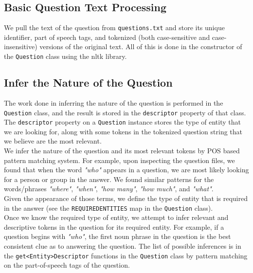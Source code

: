 \documentclass{article}
\begin{document}
\subsection{Basic Question Text Processing}
We pull the text of the question from \texttt{questions.txt} and store its unique identifier, part of speech tags, and tokenized (both case-sensitive and case-insensitive) versions of the original text. All of this is done in the constructor of the \texttt{Question} class using the nltk library.

\subsection{Infer the Nature of the Question}
The work done in inferring the nature of the question is performed in the \texttt{Question} class, and the result is stored in the \texttt{descriptor} property of that class. The \texttt{descriptor} property on a \texttt{Question} instance stores the type of entity that we are looking for, along with some tokens in the tokenized question string that we believe are the most relevant.\\

We infer the nature of the question and its most relevant tokens by POS based pattern matching system. For example, upon inspecting the question files, we found that when the word \textit{"who"} appears in a question, we are most likely looking for a person or group in the answer. We found similar patterns for the words/phrases \textit{"where"},  \textit{"when"},  \textit{"how many"},  \textit{"how much"}, and  \textit{"what"}.\\

Given the appearance of those terms, we define the type of entity that is required in the answer (see the \texttt{REQUIREDENTITIES} map in the \texttt{Question} class).\\

Once we know the required type of entity, we attempt to infer relevant and descriptive tokens in the question for its required entity. For example, if a question begins with \textit{"who"}, the first noun phrase in the question is the best consistent clue as to answering the question. The list of possible inferences is in the \texttt{get\textless Entity\textgreater Descriptor} functions in the \texttt{Question} class by pattern matching on the part-of-speech tags of the question.\\
\end{document}
